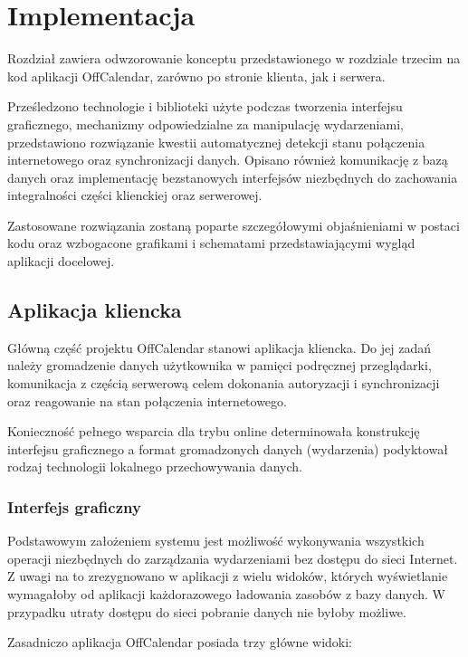 \chapter{Implementacja}
\label{cha:impl}

Rozdział zawiera odwzorowanie konceptu przedstawionego w rozdziale trzecim na kod aplikacji OffCalendar, zarówno po stronie klienta, jak i serwera. 

Prześledzono technologie i biblioteki użyte podczas tworzenia interfejsu graficznego, mechanizmy odpowiedzialne za manipulację wydarzeniami, przedstawiono rozwiązanie kwestii automatycznej detekcji stanu połączenia internetowego oraz synchronizacji danych. Opisano również komunikację z bazą danych oraz implementację bezstanowych interfejsów niezbędnych do zachowania integralności części klienckiej oraz serwerowej.

Zastosowane rozwiązania zostaną poparte szczegółowymi objaśnieniami w postaci kodu oraz wzbogacone grafikami i schematami przedstawiającymi wygląd aplikacji docelowej.


\section{Aplikacja kliencka}
\label{sec:apKli}

Główną część projektu OffCalendar stanowi aplikacja kliencka. Do jej zadań należy gromadzenie danych użytkownika w pamięci podręcznej przeglądarki, komunikacja z częścią serwerową celem dokonania autoryzacji i synchronizacji oraz reagowanie na stan połączenia internetowego. 

Konieczność pełnego wsparcia dla trybu online determinowała konstrukcję interfejsu graficznego a format gromadzonych danych (wydarzenia) podyktował rodzaj technologii lokalnego przechowywania danych.

\subsection{Interfejs graficzny}
\label{sec:intGraf}

Podstawowym założeniem systemu jest możliwość wykonywania wszystkich operacji niezbędnych do zarządzania wydarzeniami bez dostępu do sieci Internet. Z uwagi na to zrezygnowano w aplikacji z wielu widoków, których wyświetlanie wymagałoby od aplikacji każdorazowego ładowania zasobów z bazy danych. W przypadku utraty dostępu do sieci pobranie danych nie byłoby możliwe.

Zasadniczo aplikacja OffCalendar posiada trzy główne widoki:

